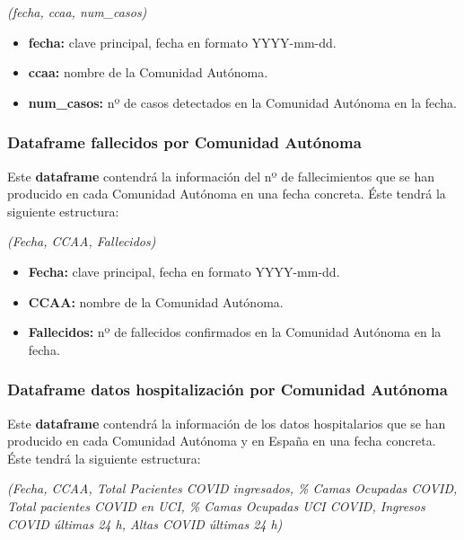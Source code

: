 \begin{center}
	\textit{(fecha, ccaa, num\_casos)}
\end{center}

\begin{itemize}
	\item \textbf{fecha:} clave principal, fecha en formato YYYY-mm-dd.
	\item \textbf{ccaa:} nombre de la Comunidad Autónoma.
	\item \textbf{num\_casos:} nº de casos detectados en la Comunidad Autónoma en la fecha.
\end{itemize}

\subsubsection{Dataframe fallecidos por Comunidad Autónoma}

Este \textbf{dataframe} contendrá la información del nº de fallecimientos que se han producido en cada Comunidad Autónoma en una fecha concreta. Éste tendrá la siguiente estructura:

\begin{center}
	\textit{(Fecha, CCAA, Fallecidos)}
\end{center}

\begin{itemize}
	\item \textbf{Fecha:} clave principal, fecha en formato YYYY-mm-dd.
	\item \textbf{CCAA:} nombre de la Comunidad Autónoma.
	\item \textbf{Fallecidos:} nº de fallecidos confirmados en la Comunidad Autónoma en la fecha.
\end{itemize}

\subsubsection{Dataframe datos hospitalización por Comunidad Autónoma}

Este \textbf{dataframe} contendrá la información de los datos hospitalarios que se han producido en cada Comunidad Autónoma y en España en una fecha concreta. Éste tendrá la siguiente estructura:

\begin{center}
	\textit{(Fecha, CCAA, Total Pacientes COVID ingresados, \% Camas Ocupadas COVID, Total pacientes COVID en UCI, \% Camas Ocupadas UCI COVID, Ingresos COVID últimas 24 h, Altas COVID últimas 24 h)}
\end{center}

